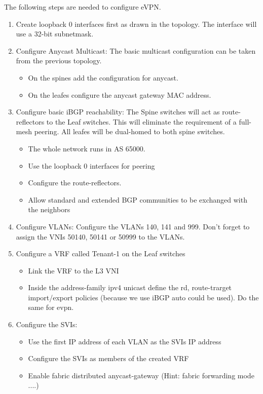 \documentclass[11pt,titlepage]{article}
\newenvironment{shadedquotation}
 {\begin{shaded*}
  \quoting[leftmargin=0pt, vskip=0pt]
 }
 {\endquoting
 \end{shaded*}
}
\begin{document}
The following steps are needed to configure eVPN.
\begin{shadedquotation}
	\begin{enumerate}
		\item Create loopback 0 interfaces first as drawn in the topology. The interface will use a 32-bit subnetmask.
		\item Configure Anycast Multicast: The basic multicast configuration can be taken from the previous topology.
		\begin{itemize}
			\item On the spines add the configuration for anycast.
			\item On the leafes configure the anycast gateway MAC address.
		\end{itemize}
		\item Configure basic iBGP reachability: The Spine switches will act as route-reflectors to the Leaf switches. This will eliminate the requirement of a full-mesh peering. All leafes will be dual-homed to both spine switches.
		\begin{itemize}
			\item The whole network runs in AS 65000.
			\item Use the loopback 0 interfaces for peering
			\item Configure the route-reflectors.
			\item Allow standard and extended BGP communities to be exchanged with the neighbors
		\end{itemize}
		\item Configure VLANs: Configure the VLANs 140, 141 and 999. Don’t forget to assign the VNIs 	50140, 50141 or 50999 to the VLANs.
		\item Configure a VRF called Tenant-1 on the Leaf switches
		\begin{itemize}
			\item Link the VRF to the L3 VNI
			\item Inside the address-family ipv4 unicast define the rd, route-trarget import/export policies (because we use iBGP auto could be used). Do the same for evpn.
		\end{itemize}
		\item Configure the SVIs:
		\begin{itemize}
			\item Use the first IP address of each VLAN as the SVIs IP address
			\item Configure the SVIs as members of the created VRF
			\item Enable fabric distributed anycast-gateway (Hint: fabric forwarding mode ....)

\end{itemize}
\end{enumerate}
\end{shadedquotation}
\end{document}
